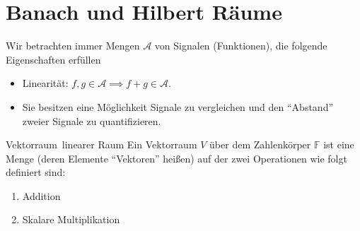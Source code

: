 \section{Banach und Hilbert Räume}

Wir betrachten immer Mengen $\mathcal{A}$ von Signalen (Funktionen), die folgende Eigenschaften erfüllen
\begin{itemize}
        \item Linearität: $f, g \in \mathcal{A} \implies f + g \in \mathcal{A}$.
        \item Sie besitzen eine Möglichkeit Signale zu vergleichen und den ``Abstand'' zweier Signale zu quantifizieren.
\end{itemize}

\begin{definition}{Vektorraum\, linearer Raum}
  Ein Vektorraum $V$ über dem Zahlenkörper $\mathbb{F}$ ist eine Menge (deren Elemente ``Vektoren'' heißen) auf der zwei Operationen wie folgt definiert sind:
  \begin{enumerate}
          \item Addition
          \item Skalare Multiplikation
  \end{enumerate}
\end{definition}
